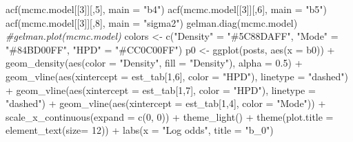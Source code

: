 \documentclass[12pt]{article}
\newenvironment{Shaded}{\begin{snugshade}}{\end{snugshade}}
\newcommand{\AttributeTok}[1]{\textcolor[rgb]{0.77,0.63,0.00}{#1}}
\newcommand{\CommentTok}[1]{\textcolor[rgb]{0.56,0.35,0.01}{\textit{#1}}}
\newcommand{\DecValTok}[1]{\textcolor[rgb]{0.00,0.00,0.81}{#1}}
\newcommand{\FloatTok}[1]{\textcolor[rgb]{0.00,0.00,0.81}{#1}}
\newcommand{\FunctionTok}[1]{\textcolor[rgb]{0.00,0.00,0.00}{#1}}
\newcommand{\NormalTok}[1]{#1}
\newcommand{\OtherTok}[1]{\textcolor[rgb]{0.56,0.35,0.01}{#1}}
\newcommand{\SpecialCharTok}[1]{\textcolor[rgb]{0.00,0.00,0.00}{#1}}
\newcommand{\StringTok}[1]{\textcolor[rgb]{0.31,0.60,0.02}{#1}}
\begin{document}
\begin{Shaded}
\begin{Highlighting}[]
\FunctionTok{acf}\NormalTok{(mcmc.model[[}\DecValTok{3}\NormalTok{]][,}\DecValTok{5}\NormalTok{], }\AttributeTok{main =} \StringTok{"b4"}\NormalTok{)}
\FunctionTok{acf}\NormalTok{(mcmc.model[[}\DecValTok{3}\NormalTok{]][,}\DecValTok{6}\NormalTok{], }\AttributeTok{main =} \StringTok{"b5"}\NormalTok{)}
\FunctionTok{acf}\NormalTok{(mcmc.model[[}\DecValTok{3}\NormalTok{]][,}\DecValTok{8}\NormalTok{], }\AttributeTok{main =} \StringTok{"sigma2"}\NormalTok{)}
\FunctionTok{gelman.diag}\NormalTok{(mcmc.model)}
\CommentTok{\#gelman.plot(mcmc.model)}
\NormalTok{colors }\OtherTok{\textless{}{-}} \FunctionTok{c}\NormalTok{(}\StringTok{"Density"} \OtherTok{=} \StringTok{"\#5C88DAFF"}\NormalTok{, }\StringTok{"Mode"} \OtherTok{=} \StringTok{"\#84BD00FF"}\NormalTok{, }\StringTok{"HPD"} \OtherTok{=} \StringTok{"\#CC0C00FF"}\NormalTok{)}
\NormalTok{p0 }\OtherTok{\textless{}{-}} \FunctionTok{ggplot}\NormalTok{(posts, }\FunctionTok{aes}\NormalTok{(}\AttributeTok{x =}\NormalTok{ b0)) }\SpecialCharTok{+}
  \FunctionTok{geom\_density}\NormalTok{(}\FunctionTok{aes}\NormalTok{(}\AttributeTok{color =} \StringTok{"Density"}\NormalTok{, }\AttributeTok{fill =} \StringTok{"Density"}\NormalTok{), }\AttributeTok{alpha =} \FloatTok{0.5}\NormalTok{) }\SpecialCharTok{+}
  \FunctionTok{geom\_vline}\NormalTok{(}\FunctionTok{aes}\NormalTok{(}\AttributeTok{xintercept =}\NormalTok{ est\_tab[}\DecValTok{1}\NormalTok{,}\DecValTok{6}\NormalTok{], }\AttributeTok{color =} \StringTok{"HPD"}\NormalTok{), }\AttributeTok{linetype =} \StringTok{"dashed"}\NormalTok{) }\SpecialCharTok{+}
  \FunctionTok{geom\_vline}\NormalTok{(}\FunctionTok{aes}\NormalTok{(}\AttributeTok{xintercept =}\NormalTok{ est\_tab[}\DecValTok{1}\NormalTok{,}\DecValTok{7}\NormalTok{], }\AttributeTok{color =} \StringTok{"HPD"}\NormalTok{), }\AttributeTok{linetype =} \StringTok{"dashed"}\NormalTok{) }\SpecialCharTok{+}
  \FunctionTok{geom\_vline}\NormalTok{(}\FunctionTok{aes}\NormalTok{(}\AttributeTok{xintercept =}\NormalTok{ est\_tab[}\DecValTok{1}\NormalTok{,}\DecValTok{4}\NormalTok{], }\AttributeTok{color =} \StringTok{"Mode"}\NormalTok{)) }\SpecialCharTok{+}
  \FunctionTok{scale\_x\_continuous}\NormalTok{(}\AttributeTok{expand =} \FunctionTok{c}\NormalTok{(}\DecValTok{0}\NormalTok{, }\DecValTok{0}\NormalTok{)) }\SpecialCharTok{+}
  \FunctionTok{theme\_light}\NormalTok{() }\SpecialCharTok{+}
  \FunctionTok{theme}\NormalTok{(}\AttributeTok{plot.title =} \FunctionTok{element\_text}\NormalTok{(}\AttributeTok{size=} \DecValTok{12}\NormalTok{)) }\SpecialCharTok{+} 
  \FunctionTok{labs}\NormalTok{(}\AttributeTok{x =} \StringTok{"Log odds"}\NormalTok{,}
       \AttributeTok{title =} \StringTok{"b\_0"}\NormalTok{)}


\end{Highlighting}
\end{Shaded}
\end{document}
